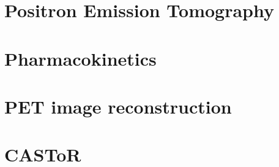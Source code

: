 
\chapter{Positron Emission Tomography}
\minitoc
 

\chapter{Pharmacokinetics}
\label{Chap2_2:Pharmacokinetics}


\chapter{PET image reconstruction}
\label{Chap2_3:Reconstruction}


\chapter{CASToR}

